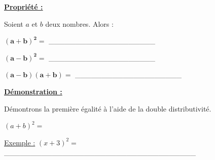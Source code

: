 \documentclass[12pt]{article}
\begin{document}
\begin{mdframed}[
    linewidth=1pt,
    roundcorner=5pt,
    linecolor=Red,
    innertopmargin=10pt,
    innerbottommargin=10pt
]
{\color{red}
\textbf{\underline{Propriété :}}

\vspace{5pt}
Soient $a$ et $b$ deux nombres. Alors :

\vspace{-20pt}
\begin{center}
    \vspace{20pt}
    $\bm{(a+b)^2 = }$ \_\_\_\_\_\_\_\_\_\_\_\_\_\_\_\_\_\_\_\_

    \vspace{20pt}
    $\bm{(a-b)^2 = }$ \_\_\_\_\_\_\_\_\_\_\_\_\_\_\_\_\_\_\_\_

    \vspace{20pt}
    $\bm{(a-b)(a+b) = }$ \_\_\_\_\_\_\_\_\_\_\_\_\_\_\_\_\_\_\_\_
\end{center}
}
\end{mdframed}

\begin{mdframed}[
    linewidth=1pt,
    roundcorner=5pt,
    linecolor=Plum,
    innertopmargin=10pt,
    innerbottommargin=10pt
]
{\color{Plum}
\textbf{\underline{Démonstration :}}}

\vspace{5pt}
Démontrons la première égalité à l'aide de la double distributivité.

\vspace{0.5cm}
$(a+b)^2 = ${\color{black!45}\dotfill}

\vspace{0.5cm}
{\color{black!45}\dotfill}

\vspace{10pt}

\end{mdframed}

\vspace{5pt}
\underline{Exemple :} $(x+3)^2 = $ \_\_\_\_\_\_\_\_\_\_\_\_\_\_\_\_\_\_\_\_\_\_\_\_\_\_\_\_\_\_\_\_\_\_\_\_
\end{document}
